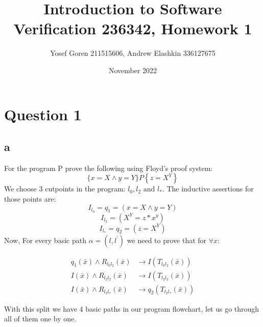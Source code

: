 \documentclass{article}
\begin{document}
\author{Yosef Goren 211515606, Andrew Elashkin 336127675}
\date{November 2022}
\title{Introduction to Software Verification 236342, Homework 1}
\maketitle
\section*{Question 1}
\subsection*{a}
For the program P prove the following using Floyd's proof system:
$$
\{x=X \wedge y=Y\} P\left\{z=X^Y\right\}
$$
We choose 3 cutpoints in the program: $l_0, l_2 \text{ and } l_*$. The inductive assertions for those points are:
$$ I_{l_0} = q_1 = (x=X \wedge y=Y)$$
$$ I_{l_2}=(X^Y= z*x^y) $$
$$ I_{l_*} = q_2 =(z=X^Y) $$
Now, For every basic path $\alpha=\left(l, l^{\prime}\right)$ we need to prove that for $\forall x$: 

\begin{align}
q_1(\bar{x}) \wedge R_{l_0 l_2}(\bar{x}) &\rightarrow I\left(T_{l_0 l_2}(\bar{x})\right) \\
I(\bar{x}) \wedge R_{l_2 l_2}(\bar{x}) &\rightarrow I\left(T_{l_2 l_2}(\bar{x})\right) \\
I(\bar{x}) \wedge R_{l_2 l_*}(\bar{x}) &\rightarrow q_2\left(T_{l_2 l_*}(\bar{x})\right)
\end{align}

With this split we have 4 basic paths in our program flowchart, let us go through all of them one by one.
\end{document}
